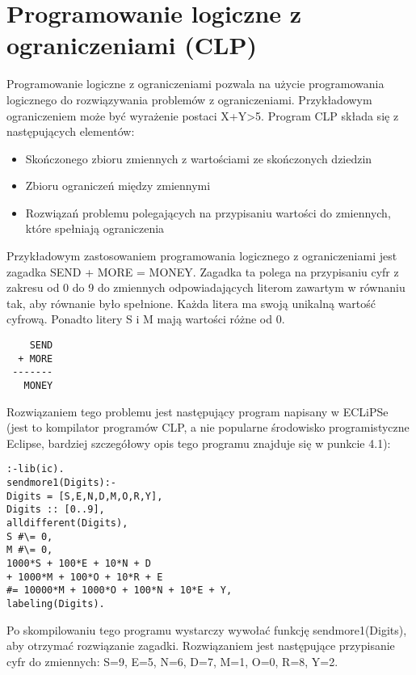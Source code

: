 \chapter{Programowanie logiczne z ograniczeniami (CLP)}

Programowanie logiczne z ograniczeniami\cite{CLP} pozwala na użycie programowania logicznego do rozwiązywania problemów z ograniczeniami. Przykładowym ograniczeniem może być wyrażenie postaci X+Y>5. 
Program CLP składa się z następujących elementów:
\begin{itemize}
\item{Skończonego zbioru zmiennych z wartościami ze skończonych dziedzin}
\item{Zbioru ograniczeń między zmiennymi}
\item{Rozwiązań problemu polegających na przypisaniu wartości do zmiennych, które spełniają ograniczenia}
\end{itemize}
Przykładowym zastosowaniem programowania logicznego z ograniczeniami jest zagadka SEND + MORE  = MONEY.\cite{Eclipse} Zagadka ta polega na przypisaniu cyfr z zakresu od 0 do 9 do zmiennych odpowiadających literom zawartym w równaniu tak, aby równanie było spełnione. Każda litera ma swoją unikalną wartość cyfrową. Ponadto litery S i M mają wartości różne od 0.


\begin{verbatim}
    SEND
  + MORE
 -------
   MONEY
\end{verbatim}
Rozwiązaniem tego problemu jest następujący program napisany w ECLiPSe (jest to kompilator programów CLP, a nie popularne środowisko programistyczne Eclipse, bardziej szczegółowy opis tego programu znajduje się w punkcie 4.1):
\newpage
\begin{verbatim}
:-lib(ic).
sendmore1(Digits):-
Digits = [S,E,N,D,M,O,R,Y],
Digits :: [0..9],
alldifferent(Digits),
S #\= 0,
M #\= 0,
1000*S + 100*E + 10*N + D
+ 1000*M + 100*O + 10*R + E
#= 10000*M + 1000*O + 100*N + 10*E + Y,
labeling(Digits).
\end{verbatim}
Po skompilowaniu tego programu wystarczy wywołać funkcję sendmore1(Digits), aby otrzymać rozwiązanie zagadki. Rozwiązaniem jest następujące przypisanie cyfr do zmiennych: S=9, E=5, N=6, D=7, M=1, O=0, R=8, Y=2. 

